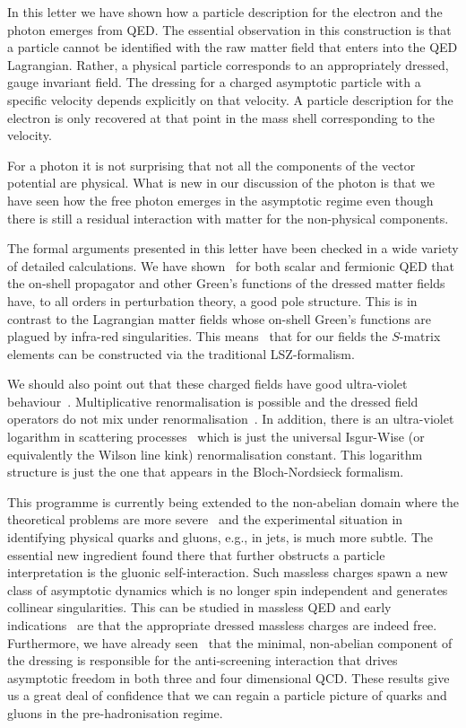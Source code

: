 \documentclass[12pt,a4paper]{article}
\newcommand{\no}{\noindent}
\begin{document}
\smallskip

\no In this letter we have shown how a particle description for the
electron and the photon emerges from QED. The essential observation
in this construction is that a particle cannot be identified with the
raw matter field that
enters into the QED Lagrangian. Rather, a physical particle
corresponds to an appropriately dressed, gauge invariant field.
The dressing for a charged  asymptotic particle with a specific velocity
depends explicitly on that velocity. A particle description for the electron
is only recovered at that point in the mass shell corresponding to
the
velocity.

For a photon it is not  surprising that not all the components of the
vector potential are physical. What is new in our discussion of
the photon is that we have
seen how the free photon emerges in the asymptotic regime even though there
is still a residual interaction with matter for the
non-physical components.


The formal arguments presented in this letter have been checked in
a wide variety of detailed calculations. We have
shown~\cite{Bagan:1998kg,Bagan:1999jk}
for both scalar and fermionic QED that the on-shell propagator and
other Green's functions of the dressed matter fields have, to all
orders in perturbation theory, a good
pole structure. This is in contrast to the Lagrangian matter fields whose
on-shell Green's functions are plagued by infra-red singularities.
This means~\cite{Bagan:1999jf} that for our fields the $S$-matrix
elements can be constructed via the traditional LSZ-formalism.

We should also point out that these charged fields have good
ultra-violet behaviour~\cite{Bagan:1997su,Bagan:1999jk}.
Multiplicative renormalisation is possible and the dressed field
operators do
not mix under renormalisation~\cite{Bagan:1999jk}. In addition,
there is an ultra-violet logarithm in scattering
processes~\cite{Bagan:1999jk} which is just the universal
Isgur-Wise (or equivalently the Wilson line kink) renormalisation
constant. This logarithm structure is just the one that appears
in the Bloch-Nordsieck formalism.

This programme is currently being extended to the non-abelian
domain where the theoretical problems are more
severe~\cite{Ciafaloni:1989vs,buchholz:1996} and the
experimental situation in identifying physical quarks and gluons,
e.g., in jets, is much more subtle.
The essential new ingredient found there that further obstructs a
particle interpretation is the gluonic self-interaction. Such
massless charges spawn a new class of asymptotic  dynamics which
is no longer spin independent and generates collinear
singularities. This can be studied in massless QED and early
indications~\cite{Horan:1998im} are that the appropriate dressed
massless charges are indeed free. Furthermore, we have already
seen~\cite{Lavelle:1998dv} that the minimal, non-abelian component
of the dressing is responsible for the anti-screening interaction
that drives asymptotic freedom in both three and four
dimensional QCD. These results give us a great deal of confidence
that we can regain a particle picture of quarks and gluons in the
pre-hadronisation regime.
\end{document}
